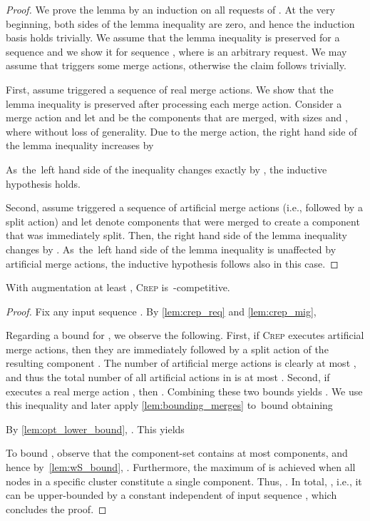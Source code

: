 \documentclass{siamart190516}
\newcommand{\CREP}{\textsc{Crep}\xspace}
\begin{document}
\begin{proof}
We prove the lemma by an induction on all requests of . At the very
beginning, both sides of the lemma inequality are zero, and hence the induction
basis holds trivially. We assume that the lemma inequality is preserved for a
sequence  and we show it for sequence , where 
is an arbitrary request. We may assume that  triggers some merge actions,
otherwise the claim follows trivially.

First, assume  triggered a sequence of real merge actions. We show that the
lemma inequality is preserved after processing each merge action. Consider a
merge action and let  and  be the components that are merged, with
sizes  and , where  without loss of generality.
Due to the merge action, the right hand side of the lemma inequality increases
by

As~the~left hand side of the inequality changes exactly by , the inductive
hypothesis holds.

Second, assume  triggered a sequence of artificial merge actions (i.e., followed by a
split action) and let  denote components that were
merged to create a component  that was immediately split. Then, the right
hand side of the lemma inequality changes by .
As~the~left hand side of the lemma inequality is unaffected by artificial
merge actions, the inductive hypothesis follows also in this case.
\end{proof}


\begin{theorem}
With augmentation at least , \CREP is~-competitive.
\end{theorem}

\begin{proof}
Fix any input sequence . 
By \cref{lem:crep_req} and \cref{lem:crep_mig}, 


Regarding a bound for , we observe the following. First, if \CREP
executes artificial merge actions, then they are immediately followed by a
split action of the resulting component . The number of artificial merge
actions is clearly at most , and thus the total number of all
artificial actions in  is at most .
Second, if  executes a real merge action , then
. Combining these two bounds yields . We use this inequality 
and later apply \cref{lem:bounding_merges} to~bound  obtaining

By \cref{lem:opt_lower_bound}, . This yields

To bound , observe that the component-set 
contains at most  components, and hence
by~\cref{lem:wS_bound}, . Furthermore, the maximum of  is achieved when all nodes in a specific cluster constitute a single
component. Thus, .
In total, , 
i.e., it can be upper-bounded by a constant independent of input sequence ,
which concludes the proof.
\end{proof}
\end{document}
